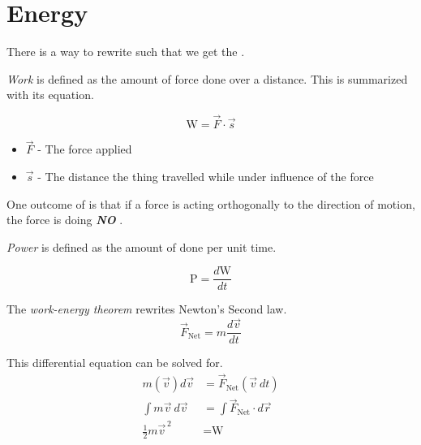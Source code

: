 \section{Energy}\label{sec:Energy}
There is a way to rewrite  such that we get the .

\begin{definition}[Work]\label{def:Work}
  \emph{Work} is defined as the amount of force done over a distance.
  This is summarized with its equation.

  \begin{equation}\label{eq:Work}
    \text{W} = \vec{F} \cdot \vec{s}
  \end{equation}
  \begin{itemize}[noitemsep, nolistsep]
    \item $\vec{F}$ - The force applied
    \item $\vec{s}$ - The distance the thing travelled while under influence of the force
  \end{itemize}

  \begin{remark}
    One outcome of  is that if a force is acting orthogonally to the direction of motion, the force is doing \textbf{\emph{NO}} .
  \end{remark}
\end{definition}

\begin{definition}[Power]\label{def:Power}
  \emph{Power} is defined as the amount of  done per unit time.

  \begin{equation}\label{eq:Power}
    \text{P} = \frac{d \text{W}}{dt}
  \end{equation}
\end{definition}

\begin{definition}\label{def:Work Kinetic Energy Theorem}
  The \emph{work-energy theorem} rewrites Newton's Second law.
  \begin{equation*}
    \vec{F}_{\text{Net}} = m \frac{d \vec{v}}{dt}
  \end{equation*}

  This differential equation can be solved for.
  \begin{align*}
    m \left( \vec{v} \right) d \vec{v} &= \vec{F}_{\text{Net}} \left( \vec{v} \: dt \right) \\
    \int m \vec{v} \: d \vec{v} &= \int \vec{F}_{\text{Net}} \cdot d \vec{r} \\ %
    \frac{1}{2} m \vec{v}^{\,2} &= \text{W} %
  \end{align*}
\end{definition}

